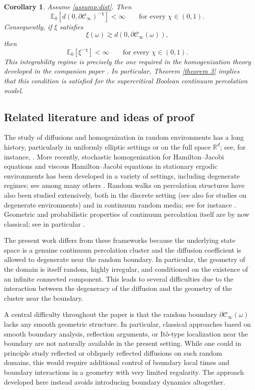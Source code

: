 \documentclass[11pt]{article}
\newcommand{\R}{\mathbb R}
\newcommand{\E}{\mathbb E}
\newtheorem{cor}[theorem]{Corollary}
\theoremstyle{rem}
\begin{document}
\begin{cor}\label{cor thm3}
Assume \ref{assump:dist}. Then 
\[ 
\E_0[d(0,\partial\mathcal C_\infty)^{-\chi}]<\infty \qquad \text{for every }  \chi \in (0,1).  
\] 
Consequently, if $\xi$ satisfies 
\[ 
\xi(\omega)  {}\gtrsim{}  d(0,\partial\mathcal C_\infty(\omega)), 
\] 
then 
\[ \E_0[\xi^{-\chi}]<\infty \qquad \text{for every }  \chi \in (0,1).  
\] 
This integrability regime is precisely the one required in the homogenization theory developed in the companion paper \cite[Assumption (A2)]{BMM26}. In particular, Theorem \ref{theorem 3} implies that this condition is satisfied for the supercritical Boolean continuum percolation model.
\end{cor}


\subsection{Related literature and ideas of proof}
The study of diffusions and homogenization in random environments has a long history, particularly in uniformly elliptic settings or on the full space $\R^d$; see, for instance,
\cite{PV81,PV82,K85,KV86,LPV87,JKO94}. More recently, stochastic homogenization for Hamilton--Jacobi equations and viscous Hamilton--Jacobi equations in stationary ergodic environments has been developed in a variety of settings, including degenerate regimes; see among many others
\cite{I99,RT00,So99,LS05,LS10,KRV06,KV08,K08}. Random walks on percolation structures have also been studied extensively, both in the discrete setting 
\cite{B04,BB07,MP07,SS04,B11,PRS15,D19} (see also \cite{ADS15,A25} for studies on degenerate environments) and in continuum random media; see for instance
\cite{S94,OS95,CD16,T24}. Geometric and probabilistic properties of continuum percolation itself are by now classical; see in particular \cite{MR96}.

The present work differs from these frameworks because the underlying state space is a genuine continuum percolation cluster and the diffusion coefficient is allowed to degenerate near the random boundary. In particular, the geometry of the domain is itself random, highly irregular, and conditioned on the existence of an infinite connected component. This leads to several difficulties due to the interaction between the degeneracy of the diffusion and the geometry of the cluster near the boundary.

A central difficulty throughout the paper is that the random boundary
$\partial\mathcal C_\infty(\omega)$
lacks any smooth geometric structure. In particular, classical approaches based on smooth boundary analysis, reflection arguments, or It{\^o}-type localization near the boundary are not naturally available in the present setting. While one could in principle study reflected or obliquely reflected diffusions on such random domains, this would require additional control of boundary local times and boundary interactions in a geometry with very limited regularity. The approach developed here instead avoids introducing boundary dynamics altogether.
\end{document}
